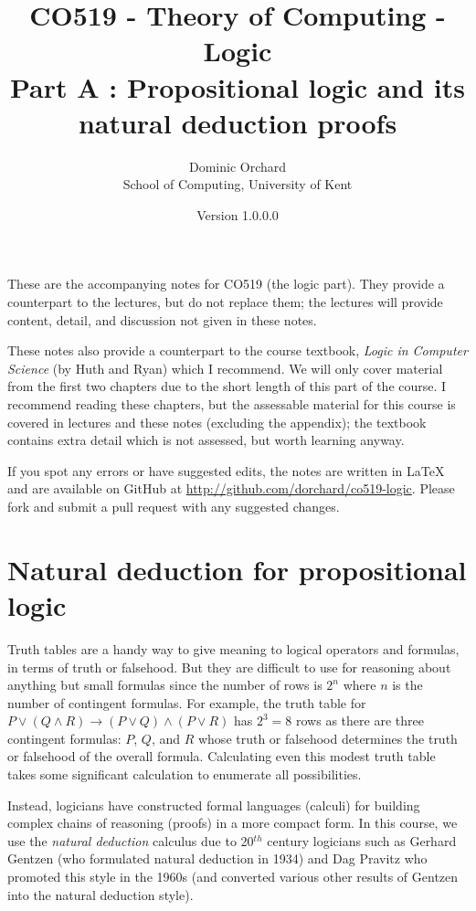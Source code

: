 \documentclass{article}
\title{\vspace{-3em}CO519 - Theory of Computing - Logic \\
  {\large{Part A : Propositional logic and its natural deduction
      proofs}}}
\author{Dominic Orchard \\
  {\small{School of Computing, University of Kent}}}
\date{Version 1.0.0.0}
\theoremstyle{definition}
\begin{document}
\maketitle

These are the accompanying notes for CO519 (the logic part). They provide
a counterpart to the lectures, but do not replace them; the lectures
will provide content, detail, and discussion not given in these notes.

These notes also provide a counterpart to the course textbook,
\emph{Logic in Computer Science} (by Huth and Ryan) which I 
recommend. We will only cover material from the first two chapters due
to the short length of this part of the course. I recommend reading
these chapters, but the assessable material for this course is
covered in lectures and these notes (excluding the appendix); the
textbook contains extra detail which is not assessed, but
worth learning anyway.

If you spot any errors or have suggested edits, the notes are written
in LaTeX and are available on GitHub at
\url{http://github.com/dorchard/co519-logic}. Please fork and submit a
pull request with any suggested changes.

\section{Natural deduction for propositional logic}

Truth tables are a handy way to give meaning to logical operators and
formulas, in terms of truth or falsehood. But they are difficult to
use for reasoning about anything but small formulas since the number
of rows is $2^n$ where $n$ is the number of contingent
formulas. For example, the truth table for
$P \vee (Q \wedge R) \rightarrow (P \vee Q) \wedge (P \vee R)$ has
$2^3 = 8$ rows as there are three contingent formulas: $P$, $Q$, and
$R$ whose truth or falsehood determines the truth or falsehood of the
overall formula. Calculating even this modest truth table takes some
significant calculation to enumerate all possibilities.

Instead, logicians have constructed formal languages (calculi) for
building complex chains of reasoning (proofs) in a more
compact form. In this course, we use the \emph{natural deduction} calculus
due to 20$^{th}$ century logicians such as Gerhard Gentzen
(who formulated natural deduction in 1934) and Dag Pravitz who 
promoted this style in the 1960s (and converted 
various other results of Gentzen into the natural deduction style).
\end{document}
